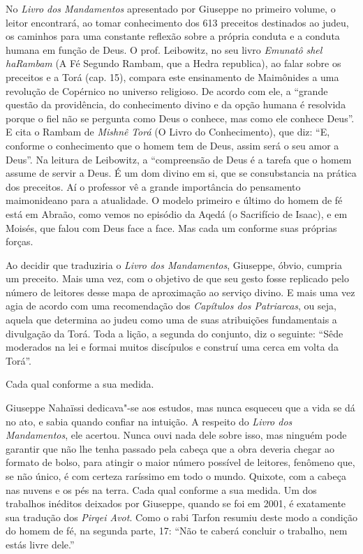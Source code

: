 No \emph{Livro dos Mandamentos} apresentado por Giuseppe no primeiro
volume, o leitor encontrará, ao tomar conhecimento dos 613 preceitos
destinados ao judeu, os caminhos para uma constante reflexão sobre a
própria conduta e a conduta humana em função de Deus. O prof. Leibowitz,
no seu livro \emph{Emunatô} \emph{shel haRambam} (A Fé Segundo Rambam,
que a Hedra republica), ao falar sobre os preceitos e a Torá (cap. 15),
compara este ensinamento de Maimônides a uma revolução de Copérnico no
universo religioso. De acordo com ele, a ``grande questão da
providência, do conhecimento divino e da opção humana é resolvida porque
o fiel não se pergunta como Deus o conhece, mas como ele conhece Deus''.
E cita o Rambam de \emph{Mishnê} \emph{Torá} (O Livro do Conhecimento),
que diz: ``E, conforme o conhecimento que o homem tem de Deus, assim
será o seu amor a Deus''. Na leitura de Leibowitz, a ``compreensão de
Deus é a tarefa que o homem assume de servir a Deus. É um dom divino em
si, que se consubstancia na prática dos preceitos. Aí o professor vê a
grande importância do pensamento maimonideano para a atualidade. O
modelo primeiro e último do homem de fé está em Abraão, como vemos no
episódio da Aqedá (o Sacrifício de Isaac), e em Moisés, que falou com
Deus face a face. Mas cada um conforme suas próprias forças.

Ao decidir que traduziria o \emph{Livro dos Mandamentos}, Giuseppe,
óbvio, cumpria um preceito. Mais uma vez, com o objetivo de que seu
gesto fosse replicado pelo número de leitores desse mapa de aproximação
ao serviço divino. E mais uma vez agia de acordo com uma recomendação
dos \emph{Capítulos dos Patriarcas}, ou seja, aquela que determina ao
judeu como uma de suas atribuições fundamentais a divulgação da Torá.
Toda a lição, a segunda do conjunto, diz o seguinte: ``Sêde moderados na
lei e formai muitos discípulos e construí uma cerca em volta da Torá''.

Cada qual conforme a sua medida.

Giuseppe Nahaïssi dedicava"-se aos estudos, mas nunca esqueceu que a vida se
dá no ato, e sabia quando confiar na intuição. A respeito do \emph{Livro
dos Mandamentos}, ele acertou. Nunca ouvi nada dele sobre isso, mas
ninguém pode garantir que não lhe tenha passado pela cabeça que a obra
deveria chegar ao formato de bolso, para atingir o maior número possível
de leitores, fenômeno que, se não único, é com certeza raríssimo em todo o
mundo. Quixote, com a cabeça nas nuvens e os pés na terra. Cada qual
conforme a sua medida. Um dos
trabalhos inéditos deixados por Giuseppe, quando se foi em 2001, é
exatamente sua tradução dos \emph{Pirqei Avot}. Como o rabi Tarfon
resumiu deste modo a condição do homem de fé, na segunda parte, 17:
``Não te caberá concluir o trabalho, nem estás livre dele.''

